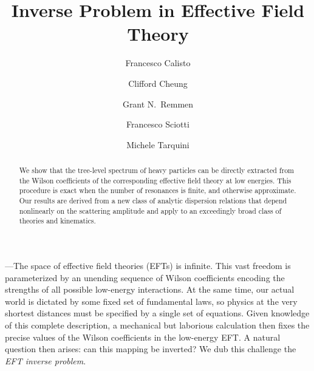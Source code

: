 \documentclass[twocolumn,english,aps,prd,reprint,floatfix,notitlepage,footinbib,preprintnumbers,superscriptaddress,longbibliography]{revtex4-1}
\newcommand{\mysec}[1]{\noindent {\bf #1.}---}
\begin{document}

\title{Inverse Problem in Effective Field Theory}

\author{Francesco Calisto}
\author{Clifford Cheung}
\author{Grant N.~Remmen}
\author{Francesco Sciotti}
\author{Michele Tarquini}



\begin{abstract}

\noindent We show that the tree-level spectrum of heavy particles can be directly extracted from the Wilson coefficients of the corresponding effective field theory at low energies.   This procedure is exact when the number of resonances is finite, and otherwise approximate.  Our results are derived from a new class of analytic dispersion relations that depend nonlinearly on the scattering amplitude and apply to an exceedingly broad class of theories and kinematics.

\end{abstract}




\maketitle


\mysec{Introduction}The space of effective field theories (EFTs) is infinite. This vast freedom is parameterized by an unending sequence of Wilson coefficients encoding the strengths of all possible low-energy interactions. At the same time, our actual world is dictated by some fixed set of fundamental laws, so physics at the very shortest distances must be specified by a single set of equations. Given knowledge of this complete description, a mechanical but laborious calculation then fixes the precise values of the Wilson coefficients in the low-energy EFT.  A natural question then arises: can this mapping be inverted?  We dub this challenge the {\it EFT inverse problem}.
\end{document}
